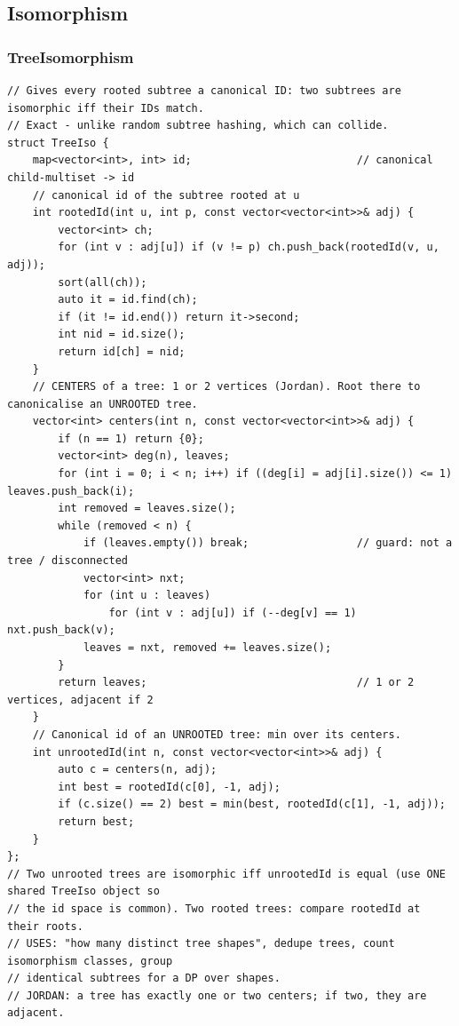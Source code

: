 \documentclass[9pt,a4paper,twocolumn]{extarticle}
\begin{document}
\subsection{Isomorphism}

\filbreak
\subsubsection{TreeIsomorphism}
\nopagebreak
\begin{lstlisting}
// Gives every rooted subtree a canonical ID: two subtrees are isomorphic iff their IDs match.
// Exact - unlike random subtree hashing, which can collide.
struct TreeIso {
    map<vector<int>, int> id;                          // canonical child-multiset -> id
    // canonical id of the subtree rooted at u
    int rootedId(int u, int p, const vector<vector<int>>& adj) {
        vector<int> ch;
        for (int v : adj[u]) if (v != p) ch.push_back(rootedId(v, u, adj));
        sort(all(ch));
        auto it = id.find(ch);
        if (it != id.end()) return it->second;
        int nid = id.size();
        return id[ch] = nid;
    }
    // CENTERS of a tree: 1 or 2 vertices (Jordan). Root there to canonicalise an UNROOTED tree.
    vector<int> centers(int n, const vector<vector<int>>& adj) {
        if (n == 1) return {0};
        vector<int> deg(n), leaves;
        for (int i = 0; i < n; i++) if ((deg[i] = adj[i].size()) <= 1) leaves.push_back(i);
        int removed = leaves.size();
        while (removed < n) {
            if (leaves.empty()) break;                 // guard: not a tree / disconnected
            vector<int> nxt;
            for (int u : leaves)
                for (int v : adj[u]) if (--deg[v] == 1) nxt.push_back(v);
            leaves = nxt, removed += leaves.size();
        }
        return leaves;                                 // 1 or 2 vertices, adjacent if 2
    }
    // Canonical id of an UNROOTED tree: min over its centers.
    int unrootedId(int n, const vector<vector<int>>& adj) {
        auto c = centers(n, adj);
        int best = rootedId(c[0], -1, adj);
        if (c.size() == 2) best = min(best, rootedId(c[1], -1, adj));
        return best;
    }
};
// Two unrooted trees are isomorphic iff unrootedId is equal (use ONE shared TreeIso object so
// the id space is common). Two rooted trees: compare rootedId at their roots.
// USES: "how many distinct tree shapes", dedupe trees, count isomorphism classes, group
// identical subtrees for a DP over shapes.
// JORDAN: a tree has exactly one or two centers; if two, they are adjacent.
\end{lstlisting}
\end{document}
